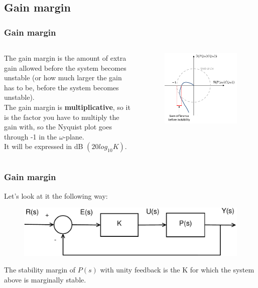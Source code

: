 \subsection{Gain margin}

\begin{frame}
	\frametitle{Gain margin}
	\begin{columns}
		The gain margin is the amount of extra gain allowed before the system becomes unstable (or how much larger the gain has to be, before the system becomes unstable).\\
		\medskip
		The gain margin is \textbf{multiplicative}, so it is the factor you have to multiply the gain with, so the Nyquist plot goes through -1 in the $\omega$-plane.\\
		It will be expressed in dB $(20log_{10}K)$.
		\vspace{-4ex}
		\begin{figure}
			\includegraphics[width=1.1\linewidth]{gain_margin}
		\end{figure}
	\end{columns}
\end{frame}

\begin{frame}
	\frametitle{Gain margin}
	\vspace{-6ex}
	Let's look at it the following way:
	\begin{figure}
		\includegraphics[width=0.8\linewidth]{closedloop2}
	\end{figure}
	The stability margin of $P(s)$ with unity feedback is the K for which the system above is marginally stable.
\end{frame}


